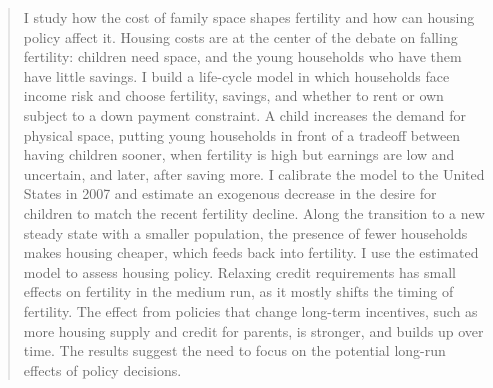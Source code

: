 \begin{abstract}
\noindent
I study how the cost of family space shapes fertility and how can housing
policy affect it. Housing costs are at the center of the debate on falling
fertility: children need space, and the young households who have them have
little savings. I build a life-cycle model in which households face income risk and choose fertility, savings, and whether to rent or own subject to a down payment constraint. A child increases the demand for physical space, putting young households in front of a tradeoff between having children sooner, when fertility is high but earnings are low and uncertain, and later, after saving more. I calibrate the model to the United States in 2007 and estimate an exogenous decrease in the desire for children to match the recent fertility decline. Along the transition to a new steady state with a smaller population, the presence of fewer households makes housing cheaper, which feeds back into fertility. I use the estimated model to assess housing policy. Relaxing credit requirements has small effects on fertility in the medium run, as it mostly shifts the timing of fertility. The effect from policies that change long-term incentives, such as more housing supply and credit for parents, is stronger, and builds up over time. The results suggest the need to focus on the potential long-run effects of policy decisions.

\end{abstract}
